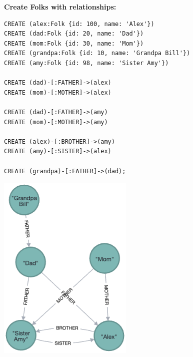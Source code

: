 \documentclass[14pt,a4paper]{extarticle}
\begin{document}
	\noindent \textbf{Create Folks with relationships:}
	\begin{lstlisting}[style=sql]
CREATE (alex:Folk {id: 100, name: 'Alex'})
CREATE (dad:Folk {id: 20, name: 'Dad'})
CREATE (mom:Folk {id: 30, name: 'Mom'})
CREATE (grandpa:Folk {id: 10, name: 'Grandpa Bill'})
CREATE (amy:Folk {id: 98, name: 'Sister Amy'})

CREATE (dad)-[:FATHER]->(alex)
CREATE (mom)-[:MOTHER]->(alex)

CREATE (dad)-[:FATHER]->(amy)
CREATE (mom)-[:MOTHER]->(amy)

CREATE (alex)-[:BROTHER]->(amy)
CREATE (amy)-[:SISTER]->(alex)

CREATE (grandpa)-[:FATHER]->(dad);
	\end{lstlisting}

	\begin{center}
		\includegraphics[height=9cm]{images/folks.png}
	\end{center}

	\pagebreak
\end{document}

